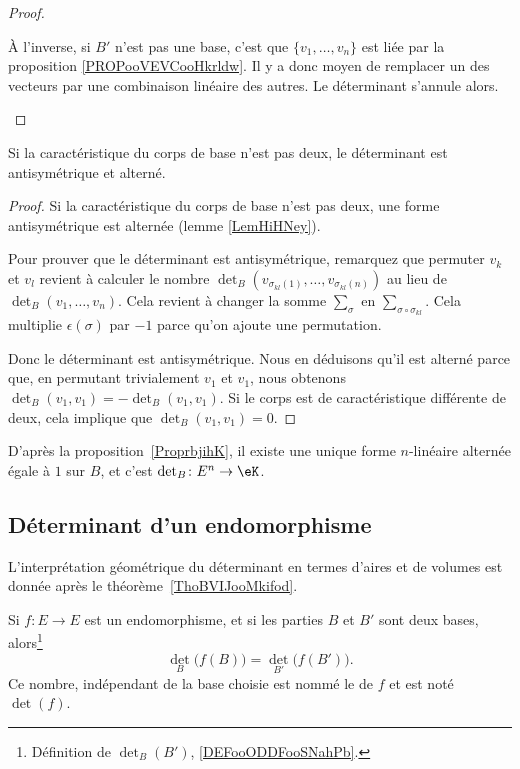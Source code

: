 \begin{proof}
\begin{subproof}
		À l'inverse, si \( B'\) n'est pas une base, c'est que \( \{ v_1,\ldots, v_n \}\) est liée par la proposition \ref{PROPooVEVCooHkrldw}. Il y a donc moyen de remplacer un des vecteurs par une combinaison linéaire des autres. Le déterminant s'annule alors.
	\end{subproof}
\end{proof}

\begin{proposition}     \label{PROPooXNLDooGGkHpd}
	Si la caractéristique du corps de base n'est pas deux, le déterminant est antisymétrique et alterné.
\end{proposition}

\begin{proof}
	Si la caractéristique du corps de base n'est pas deux, une forme antisymétrique est alternée (lemme \ref{LemHiHNey}).

	Pour prouver que le déterminant est antisymétrique, remarquez que permuter \( v_k\) et \( v_l\) revient à calculer le nombre \( \det_B( v_{\sigma_{kl}(1)},\ldots, v_{\sigma_{kl}(n)} )\) au lieu de \( \det_B(v_1,\ldots, v_n)\). Cela revient à changer la somme \( \sum_{\sigma}\) en \( \sum_{\sigma\circ\sigma_{kl}}\). Cela multiplie \( \epsilon(\sigma)\) par \( -1\) parce qu'on ajoute une permutation.

	Donc le déterminant est antisymétrique. Nous en déduisons qu'il est alterné parce que, en permutant trivialement \( v_1\) et \( v_1\), nous obtenons \( \det_B(v_1,v_1)=-\det_B(v_1,v_1)\). Si le corps est de caractéristique différente de deux, cela implique que \( \det_B(v_1,v_1)=0\).
\end{proof}

D'après la proposition~\ref{ProprbjihK}, il existe une unique forme \( n\)-linéaire alternée égale à \( 1\) sur \( B\), et c'est \( \det_B\colon E^n\to \eK\).

\subsection{Déterminant d'un endomorphisme}

L'interprétation géométrique du déterminant en termes d'aires et de volumes est donnée après le théorème~\ref{ThoBVIJooMkifod}.

\begin{lemmaDef}       \label{LEMooQTRVooAKzucd}      \label{DefCOZEooGhRfxA}
	Si \( f\colon E\to E\) est un endomorphisme, et si les parties \( B\) et \( B'\) sont deux bases, alors\footnote{Définition de \( \det_B(B')\), \ref{DEFooODDFooSNahPb}.}
	\begin{equation}
		\det_B\big( f(B) \big)=\det_{B'}\big( f(B') \big).
	\end{equation}
	Ce nombre, indépendant de la base choisie est nommé le  de \( f\) et est noté \( \det(f)\).
\end{lemmaDef}

